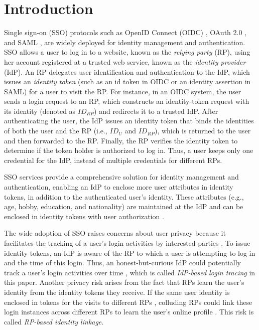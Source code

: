 \section{Introduction}
\label{sec:intro}
Single sign-on (SSO) protocols such as OpenID Connect (OIDC) \cite{OpenIDConnect}, OAuth 2.0 \cite{rfc6749}, and SAML \cite{SAML, SAMLIdentifier}, are widely deployed for identity management and authentication.
SSO allows a user to log in to a website,
 known as the \emph{relying party} (RP), using her account registered at a trusted web service, known as the \emph{identity provider} (IdP).
An RP delegates user identification and authentication to the IdP, which issues an \emph{identity token} (such as an id token in OIDC or an identity assertion in SAML) for a user to visit the RP. %
For instance, in an OIDC system, the user sends a login request to an RP,
which constructs an identity-token request with its identity (denoted as $ID_{RP}$) and redirects it to a trusted IdP. After authenticating the user, the IdP issues an identity token that binds the identities of both the user and the RP (i.e., $ID_U$ and $ID_{RP}$), which is returned to the user and then forwarded to the RP.
Finally, the RP verifies the identity token to determine if the token holder is authorized to log in. Thus, a user keeps only one credential for the IdP, instead of multiple credentials for different RPs.

SSO services provide a comprehensive solution for identity management and authentication, enabling an IdP to enclose more user attributes in identity tokens, in addition to the authenticated user's identity.
These attributes (e.g., age, hobby, education, and nationality) are maintained at the IdP and can be enclosed in identity tokens with user authorization \cite{OpenIDConnect,rfc6749}.

The wide adoption of SSO raises concerns about user privacy because it facilitates the tracking of a user's login activities by interested parties \cite{NIST2017draft, SPRESSO, BrowserID, maler2008venn}.
To issue identity tokens, %
 an IdP is aware of the RP to which a user is attempting to log in and the time of this login.
Thus, an honest-but-curious IdP could potentially track a user's login activities over time \cite{BrowserID, SPRESSO},
which is called {\em IdP-based login tracing} in this paper.
Another privacy risk arises from the fact that RPs learn the user's identity from the identity tokens they receive.
If the same user identity is enclosed in tokens for the visits to different RPs \cite{maler2008venn, Google, FirefoxAccount}, colluding RPs could link these login instances across different RPs %
to learn the user's online profile \cite{maler2008venn}.
This risk is called {\em RP-based identity linkage}.


